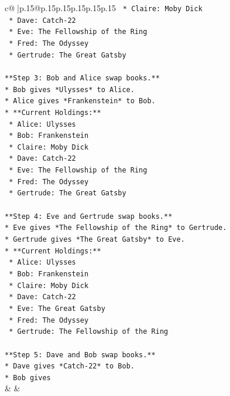 \documentclass{article}
\begin{document}
{\begin{supertabular}{c@{$\;$}|p{.15\linewidth}@{}p{.15\linewidth}p{.15\linewidth}p{.15\linewidth}p{.15\linewidth}p{.15\linewidth}}
{{{\texttt{    *   Claire: Moby Dick} \\
\texttt{    *   Dave: Catch{-}22} \\
\texttt{    *   Eve: The Fellowship of the Ring} \\
\texttt{    *   Fred: The Odyssey} \\
\texttt{    *   Gertrude: The Great Gatsby} \\
\\ 
\texttt{**Step 3: Bob and Alice swap books.**} \\
\texttt{*   Bob gives *Ulysses* to Alice.} \\
\texttt{*   Alice gives *Frankenstein* to Bob.} \\
\texttt{*   **Current Holdings:**} \\
\texttt{    *   Alice: Ulysses} \\
\texttt{    *   Bob: Frankenstein} \\
\texttt{    *   Claire: Moby Dick} \\
\texttt{    *   Dave: Catch{-}22} \\
\texttt{    *   Eve: The Fellowship of the Ring} \\
\texttt{    *   Fred: The Odyssey} \\
\texttt{    *   Gertrude: The Great Gatsby} \\
\\ 
\texttt{**Step 4: Eve and Gertrude swap books.**} \\
\texttt{*   Eve gives *The Fellowship of the Ring* to Gertrude.} \\
\texttt{*   Gertrude gives *The Great Gatsby* to Eve.} \\
\texttt{*   **Current Holdings:**} \\
\texttt{    *   Alice: Ulysses} \\
\texttt{    *   Bob: Frankenstein} \\
\texttt{    *   Claire: Moby Dick} \\
\texttt{    *   Dave: Catch{-}22} \\
\texttt{    *   Eve: The Great Gatsby} \\
\texttt{    *   Fred: The Odyssey} \\
\texttt{    *   Gertrude: The Fellowship of the Ring} \\
\\ 
\texttt{**Step 5: Dave and Bob swap books.**} \\
\texttt{*   Dave gives *Catch{-}22* to Bob.} \\
\texttt{*   Bob gives} \\
            }
        }
    }
    & & \\ \\


\end{supertabular}}
\end{document}
